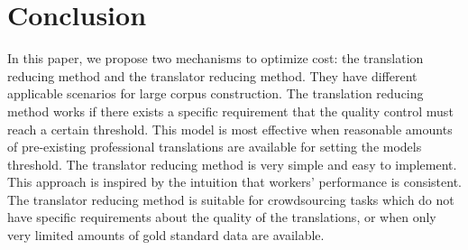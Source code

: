 \documentclass[11pt,letterpaper]{article}
\begin{document}
\section{Conclusion}
In this paper, we propose two mechanisms to optimize cost: the translation reducing method and the translator reducing method. They have different applicable scenarios for large corpus construction.
The translation reducing method works if there exists a specific requirement that the quality control must reach a certain threshold. 
This model is most effective when reasonable amounts of pre-existing professional translations are available for setting the models threshold. 
The translator reducing method is very simple and easy to implement. This approach is inspired by the intuition that workers' performance is consistent. The translator reducing method is suitable for crowdsourcing tasks which do not have specific requirements about the quality of the translations, 
or when only very limited amounts of gold standard data are available.


 

\end{document}
